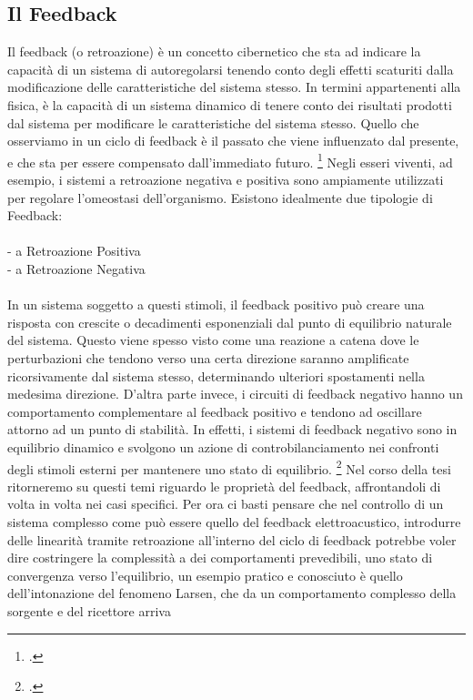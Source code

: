 \subsection{Il Feedback}
\label{sec:Il Feedback}
Il feedback (o retroazione) è un concetto cibernetico che sta ad indicare
la capacità di un sistema di autoregolarsi tenendo conto degli effetti scaturiti
dalla modificazione delle caratteristiche del sistema stesso.
In termini appartenenti alla fisica, è la capacità di un sistema dinamico
di tenere conto dei risultati prodotti dal sistema per
modificare le caratteristiche del sistema stesso.
Quello che osserviamo in un ciclo di feedback è
il passato che viene influenzato dal presente,
e che sta per essere compensato dall'immediato
futuro. \footcite{sanfilippocasaesthetics}
Negli esseri viventi, ad esempio, i sistemi a retroazione negativa e positiva
sono ampiamente utilizzati per regolare l'omeostasi dell'organismo.
Esistono idealmente due tipologie di Feedback:
\\ \\
- a Retroazione Positiva
\\
- a Retroazione Negativa
\\ \\
In un sistema soggetto a questi stimoli,
il feedback positivo può creare una risposta con crescite o decadimenti esponenziali
dal punto di equilibrio naturale del sistema.
Questo viene spesso visto come una reazione a catena
dove le perturbazioni che tendono verso una certa direzione
saranno amplificate ricorsivamente dal
sistema stesso, determinando ulteriori spostamenti nella medesima direzione.
D'altra parte invece, i circuiti di feedback negativo hanno
un comportamento complementare al feedback positivo e tendono ad oscillare
attorno ad un punto di stabilità.
In effetti, i sistemi di feedback negativo sono in equilibrio dinamico
e svolgono un azione di controbilanciamento nei confronti degli stimoli esterni
per mantenere uno stato di equilibrio. \footcite{sanfilippocasaesthetics}
Nel corso della tesi ritorneremo su questi temi
riguardo le proprietà del feedback, affrontandoli di volta in volta
nei casi specifici.
Per ora ci basti pensare che nel controllo di un sistema complesso
come può essere quello del feedback elettroacustico,
introdurre delle linearità tramite retroazione all'interno del ciclo di
feedback potrebbe voler dire costringere la complessità
a dei comportamenti prevedibili, uno stato di convergenza verso l'equilibrio,
un esempio pratico e conosciuto è quello dell'intonazione del fenomeno Larsen,
che da un comportamento complesso della sorgente e del ricettore arriva
